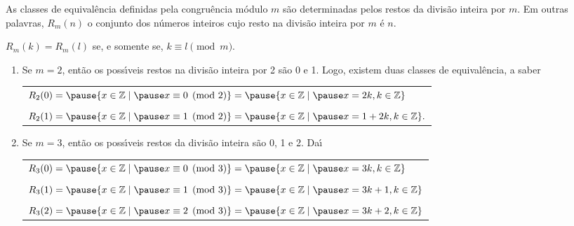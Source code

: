 \documentclass{beamer}
\begin{document}
    \begin{frame}
        \begin{proposicao}
            As classes de equival{\^e}ncia definidas pela congru{\^e}ncia m{\'o}dulo $m$ \pause s{\~a}o determinadas pelos restos da divis{\~a}o inteira por $m$. \pause Em outras palavras, $R_{m}(n)$  o conjunto dos n{\'u}meros inteiros \pause cujo resto na divis{\~a}o inteira por $m$ {\'e} $n$.\pause
        \end{proposicao}

        \begin{corolario}
            $R_{m}(k) = R_{m}(l)$ \pause se, e somente se, $k\equiv l \pmod{m}$.\pause
        \end{corolario}
    \end{frame}
    \begin{frame}
        \begin{exemplos}
            \begin{enumerate}[label={\arabic*})]
                \item Se $m=2$, \pause ent{\~a}o os poss{\'\i}veis restos na divis{\~a}o inteira por 2 s{\~a}o 0 e 1. \pause Logo, existem duas classes de equival{\^e}ncia, a saber\pause
                \begin{center}
                    \begin{tabular}{l}
                        $R_{2}(0) = \pause \{x \in \z \mid \pause x\equiv 0 \pmod{2}\} = \pause \{x\in \z \mid \pause x = 2k, k \in \z \}$\pause \\
                        \\
                        $R_{2}(1) = \pause \{x \in \z \mid \pause x\equiv 1 \pmod{2}\} = \pause \{x \in \z \mid \pause x = 1 + 2k, k\in \z \}.$\pause
                    \end{tabular}
                \end{center}
                \vspace{.3cm}
                \item Se $m = 3$, \pause ent{\~a}o os poss{\'\i}veis restos da divis{\~a}o inteira s{\~a}o 0, 1 e 2. \pause Da{\'\i}\pause
                \begin{center}
                    \begin{tabular}{l}
                        $R_{3}(0) = \pause \{x \in \z \mid \pause x\equiv 0 \pmod{3}\} = \pause \{x \in \z \mid \pause x = 3k, k \in \z\}$\pause\\
                        \\
                        $R_{3}(1)  = \pause \{x \in \z \mid \pause x\equiv 1 \pmod{3}\} = \pause \{x \in \z \mid \pause x = 3k + 1, k \in \z \}$\pause\\
                        \\
                        $R_{3}(2) = \pause \{x \in \z \mid \pause x \equiv 2 \pmod{3}\} = \pause \{x \in \z \mid \pause x = 3k + 2, k \in \z\}$\pause
                    \end{tabular}
                \end{center}
            \end{enumerate} 
        \end{exemplos}
    \end{frame}
\end{document}
